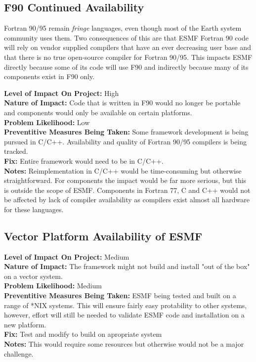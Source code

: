 \documentclass[english]{article}
\newcommand{\sreq}[1]{\subsection{\hspace{.2in}#1}}
\newenvironment
{reqlist}
{\begin{list} {} {} \rm \item[]}
{\end{list}}
\begin{document}
\sreq{F90 Continued Availability}
Fortran 90/95 remain {\it fringe} languages, even though most of the Earth system
community uses them. Two consequences of this are that ESMF Fortran 90 code will
rely on vendor supplied compilers that have an ever decreasing user base and
that there is no true open-source compiler for Fortran 90/95.
This impacts ESMF directly because some of its code will use F90 and
indirectly because many of its components exist in F90 only.
\begin{reqlist}
{\bf Level of Impact On Project:} High \\
{\bf Nature of Impact:} Code that is written in F90 would no longer be portable
and components would only be available on certain platforms. \\
{\bf Problem Likelihood:} Low\\
{\bf Preventitive Measures Being Taken:} Some framework development is being pursued in C/C++.
Availability and quality of Fortran 90/95 compilers
is being tracked.\\
{\bf Fix:} Entire framework would need to be in C/C++.\\
{\bf Notes:} Reimplementation in C/C++ would be time-consuming but
otherwise straightforward. For components the impact would be far more
serious, but this is outside the scope of ESMF.
Components in Fortran 77, C and C++ would not be affected by lack of 
compiler availability as compilers exist almost all hardware for these languages.
\end{reqlist}

\sreq{Vector Platform Availability of ESMF}
\begin{reqlist}
{\bf Level of Impact On Project:} Medium \\
{\bf Nature of Impact:} The framework might not build and install "out of the box"
on a vector system.\\
{\bf Problem Likelihood:} Medium\\
{\bf Preventitive Measures Being Taken:} ESMF being tested and built on a range of *NIX systems. This will
ensure fairly easy protability to other systems, however, effort will still be needed 
to validate ESMF code and installation on a new platform. \\
{\bf Fix:} Test and modify to build on apropriate system\\
{\bf Notes:} This would require some resources but otherwise would not be a major challenge.
\end{reqlist}
\end{document}
